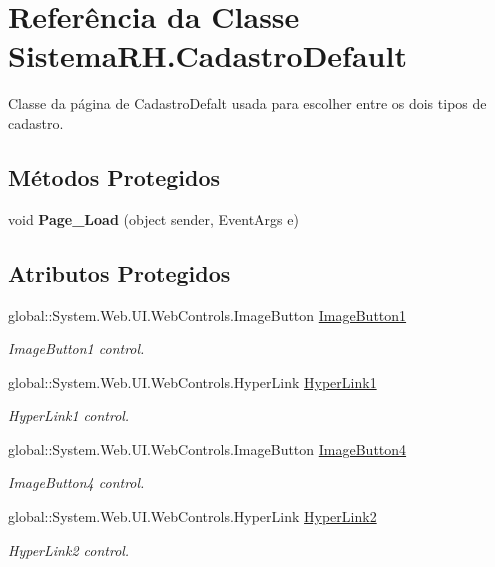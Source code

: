\hypertarget{class_sistema_r_h_1_1_cadastro_default}{
\section{Referência da Classe SistemaRH.CadastroDefault}
\label{class_sistema_r_h_1_1_cadastro_default}
}


Classe da página de CadastroDefalt usada para escolher entre os dois tipos de cadastro.  


\subsection*{Métodos Protegidos}
\begin{DoxyCompactItemize}
\item 
\hypertarget{class_sistema_r_h_1_1_cadastro_default_a92cb48980cfc0b441342679cb0917120}{
void {\bfseries Page\_\-Load} (object sender, EventArgs e)}
\label{class_sistema_r_h_1_1_cadastro_default_a92cb48980cfc0b441342679cb0917120}

\end{DoxyCompactItemize}
\subsection*{Atributos Protegidos}
\begin{DoxyCompactItemize}
\item 
global::System.Web.UI.WebControls.ImageButton \hyperlink{class_sistema_r_h_1_1_cadastro_default_a4159df0797993e5cdcd157bee1f45d39}{ImageButton1}
\begin{DoxyCompactList}\small\item\em ImageButton1 control. \item\end{DoxyCompactList}\item 
global::System.Web.UI.WebControls.HyperLink \hyperlink{class_sistema_r_h_1_1_cadastro_default_a504974069b7c2282e0e81e4d22c85045}{HyperLink1}
\begin{DoxyCompactList}\small\item\em HyperLink1 control. \item\end{DoxyCompactList}\item 
global::System.Web.UI.WebControls.ImageButton \hyperlink{class_sistema_r_h_1_1_cadastro_default_ad1e70ae28bfd2bbe912fddb7827823cc}{ImageButton4}
\begin{DoxyCompactList}\small\item\em ImageButton4 control. \item\end{DoxyCompactList}\item 
global::System.Web.UI.WebControls.HyperLink \hyperlink{class_sistema_r_h_1_1_cadastro_default_ab2b423dbaab5b2a580256786c5d491b8}{HyperLink2}
\begin{DoxyCompactList}\small\item\em HyperLink2 control. \item\end{DoxyCompactList}\end{DoxyCompactItemize}


